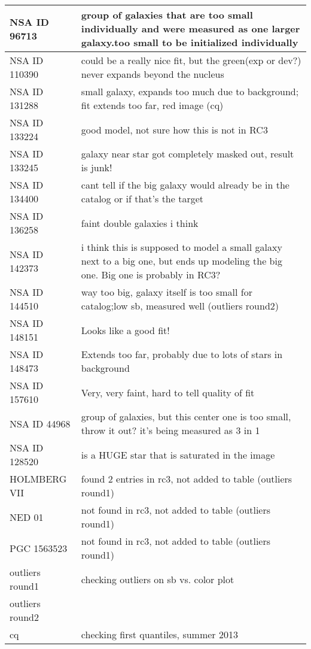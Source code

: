 \documentclass[10pt]{article}
\begin{document}
\begin{landscape}
\begin{longtable}{|l|l|}
NSA ID 96713 & group of galaxies that are too small individually and were measured as one larger galaxy.too small to be initialized individually\\ \hline
NSA ID 110390 & could be a really nice fit, but the green(exp or dev?) never expands beyond the nucleus\\ \hline
NSA ID 131288 & small galaxy, expands too much due to background; fit extends too far, red image (cq)\\ \hline
NSA ID 133224 & good model, not sure how this is not in RC3\\ \hline
NSA ID 133245 & galaxy near star got completely masked out, result is junk!\\ \hline
NSA ID 134400 & cant tell if the big galaxy would already be in the catalog or if that's the target\\ \hline
NSA ID 136258 & faint double galaxies i think\\ \hline
NSA ID 142373 & i think this is supposed to model a small galaxy next to a big one, but ends up modeling the big one. Big one is probably in RC3?\\ \hline
NSA ID 144510 & way too big, galaxy itself is too small for catalog;low sb, measured well (outliers round2)\\ \hline
NSA ID 148151 & Looks like a good fit!\\ \hline
NSA ID 148473 & Extends too far, probably due to lots of stars in background\\ \hline
NSA ID 157610 & Very, very faint, hard to tell quality of fit\\ \hline
NSA ID 44968 & group of galaxies, but this center one is too small, throw it out? it's being measured as 3 in 1\\ \hline
NSA ID 128520 & is a HUGE star that is saturated in the image\\ \hline
HOLMBERG VII & found 2 entries in rc3, not added to table (outliers round1)\\ \hline
NED 01 & not found in rc3, not added to table (outliers round1)\\ \hline
PGC 1563523 & not found in rc3, not added to table (outliers round1)\\ \hline
outliers round1 & checking outliers on sb vs. color plot\\ \hline
outliers round2 &\\ \hline
cq & checking first quantiles, summer 2013 \\ \hline
\end{longtable}
\end{landscape}
\end{document}
